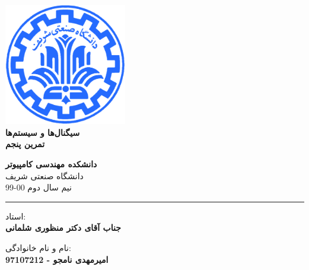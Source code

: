 \documentclass[12pt]{article}
\begin{document}
\begin{titlepage}
\begin{center}
        
\vspace*{0.7cm}

\includegraphics[width=0.4\textwidth]{sharif1.png}\\
\vspace{0.5cm}
\textbf{ \Huge{\emph ‌سیگنال‌ها و سیستم‌ها} }\\
\vspace{0.5cm}
\textbf{ \Large{ تمرین پنجم} }
\vspace{0.2cm}
       
 
      \large \textbf{دانشکده مهندسی کامپیوتر}\\\vspace{0.2cm}
    \large   دانشگاه صنعتی شریف\\\vspace{0.2cm}
       \large   ﻧﯿﻢ سال دوم 00-99 \\\vspace{0.2cm}
      \noindent\rule[1ex]{\linewidth}{1pt}
استاد:\\
    \textbf{{جناب آقای دکتر منظوری شلمانی}}


    \vspace{0.15cm}
نام و نام خانوادگی:\\

       
    \textbf{{امیرمهدی نامجو - 97107212}}
\end{center}
\end{titlepage}


\newpage
\pagestyle{fancy}
\fancyhf{}
\fancyfoot{}
\cfoot{\thepage}
\end{document}
